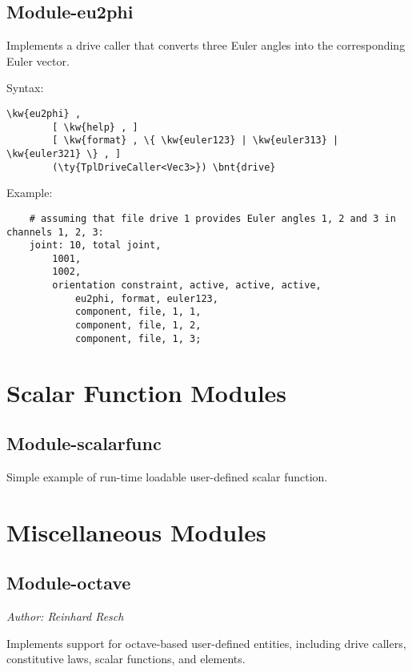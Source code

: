 \subsection{Module-eu2phi}
Implements a  drive caller
that converts three Euler angles into the corresponding Euler vector.

Syntax:
\begin{Verbatim}[commandchars=\\\{\}]
    \kw{eu2phi} ,
        [ \kw{help} , ]
        [ \kw{format} , \{ \kw{euler123} | \kw{euler313} | \kw{euler321} \} , ]
        (\ty{TplDriveCaller<Vec3>}) \bnt{drive}
\end{Verbatim}
Example:
\begin{verbatim}
    # assuming that file drive 1 provides Euler angles 1, 2 and 3 in channels 1, 2, 3:
    joint: 10, total joint,
        1001,
        1002,
        orientation constraint, active, active, active,
            eu2phi, format, euler123,
            component, file, 1, 1,
            component, file, 1, 2,
            component, file, 1, 3;
\end{verbatim}


\section{Scalar Function Modules}

\subsection{Module-scalarfunc}
Simple example of run-time loadable user-defined scalar function.



\section{Miscellaneous Modules}

\subsection{Module-octave}
\emph{Author: Reinhard Resch}

\noindent
Implements support for octave-based user-defined entities, including
drive callers, constitutive laws, scalar functions, and elements.


